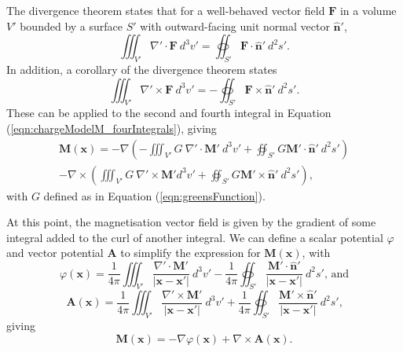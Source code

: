 The divergence theorem states that for a well-behaved vector field \(\mathbf{F}\) in a volume \(V'\) bounded by a surface \(S'\) with outward-facing unit normal vector \(\hat{\mathbf{n}}'\),
\begin{equation}
    \iiint_{V'} \nabla' \cdot \mathbf{F}\ d^3v' = \oiint_{S'} \mathbf{F} \cdot \hat{\mathbf{n}}'\ d^2s' \text{.}
\end{equation}
In addition, a corollary of the divergence theorem states
\begin{equation}
    \iiint_{V'} \nabla' \times \mathbf{F}\ d^3v' = -\oiint_{S'} \mathbf{F} \times \hat{\mathbf{n}}'\ d^2s' \text{.}
\end{equation}
These can be applied to the second and fourth integral in Equation (\ref{eqn:chargeModelM_fourIntegrals}), giving
\begin{align}
    \mathbf{M}\left(\mathbf{x}\right) = -\nabla \left( -\iiint_{V'} G\ \nabla' \cdot \mathbf{M}'\ d^3v' + \oiint_{S'} G\mathbf{M}' \cdot \hat{\mathbf{n}}'\ d^2s' \right) \nonumber \\
    -\nabla \times \left( \iiint_{V'} G\ \nabla' \times \mathbf{M}' d^3v' + \oiint_{S'} G\mathbf{M}' \times \hat{\mathbf{n}}'\ d^2s' \right) \text{,}
\end{align}
with \(G\) defined as in Equation (\ref{eqn:greensFunction}).

At this point, the magnetisation vector field is given by the gradient of some integral added to the curl of another integral. We can define a scalar potential \(\varphi\) and vector potential \(\mathbf{A}\) to simplify the expression for \(\mathbf{M}\left(\mathbf{x}\right)\), with
\begin{equation}
    \varphi\left(\mathbf{x}\right) = \frac{1}{4\pi} \iiint_{V'} \frac{\nabla' \cdot \mathbf{M}'}{\left| \mathbf{x} - \mathbf{x}'\right|}\ d^3v' - \frac{1}{4\pi} \oiint_{S'} \frac{\mathbf{M}'\cdot \hat{\mathbf{n}}'}{\left| \mathbf{x} - \mathbf{x}'\right|}\ d^2s' \text{, and}
\end{equation}
\begin{equation}
    \mathbf{A}\left(\mathbf{x}\right) = \frac{1}{4\pi} \iiint_{V'} \frac{\nabla' \times \mathbf{M}'}{\left| \mathbf{x} - \mathbf{x}'\right|}\ d^3v' + \frac{1}{4\pi} \oiint_{S'} \frac{\mathbf{M}'\times \hat{\mathbf{n}}'}{\left| \mathbf{x} - \mathbf{x}'\right|}\ d^2s' \text{,}
\end{equation}
giving
\begin{equation}
    \mathbf{M}\left(\mathbf{x}\right) = -\nabla \varphi\left(\mathbf{x}\right) + \nabla \times \mathbf{A}\left(\mathbf{x}\right) \text{.}
\end{equation}

